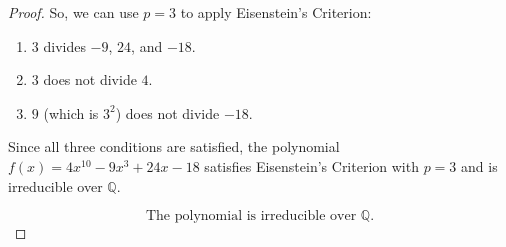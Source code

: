 \documentclass[12pt]{amsart}
\theoremstyle{definition}
\numberwithin{equation}{section}
\theoremstyle{plain}
\begin{document}
\begin{exercise}{20}
\begin{proof}
So, we can use \( p = 3 \) to apply Eisenstein's Criterion:

\begin{enumerate}
    \item \( 3 \) divides \( -9 \), \( 24 \), and \( -18 \).
    \item \( 3 \) does not divide \( 4 \).
    \item \( 9 \) (which is \( 3^2 \)) does not divide \( -18 \).
\end{enumerate}

Since all three conditions are satisfied, the polynomial \( f(x) = 4x^{10} - 9x^3 + 24x - 18 \) satisfies Eisenstein's Criterion with \( p = 3 \) and is irreducible over \( \mathbb{Q} \). 

\[
\boxed{\text{The polynomial is irreducible over } \mathbb{Q}.}
\]
    \end{proof}
\end{exercise}
\end{document}
